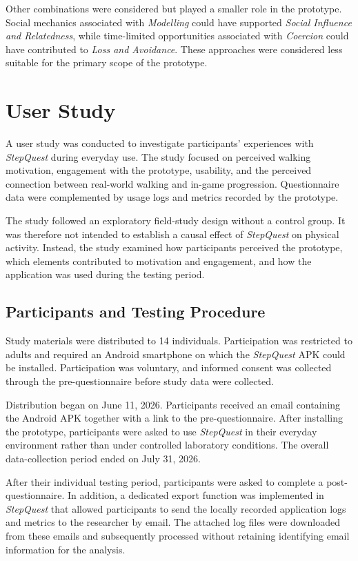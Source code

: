 Other combinations were considered but played a smaller role in the prototype. Social mechanics associated with \textit{Modelling} could have supported \textit{Social Influence and Relatedness}, while time-limited opportunities associated with \textit{Coercion} could have contributed to \textit{Loss and Avoidance}. These approaches were considered less suitable for the primary scope of the prototype.

\section{User Study}

A user study was conducted to investigate participants' experiences with \textit{StepQuest} during everyday use. The study focused on perceived walking motivation, engagement with the prototype, usability, and the perceived connection between real-world walking and in-game progression. Questionnaire data were complemented by usage logs and metrics recorded by the prototype.

The study followed an exploratory field-study design without a control group. It was therefore not intended to establish a causal effect of \textit{StepQuest} on physical activity. Instead, the study examined how participants perceived the prototype, which elements contributed to motivation and engagement, and how the application was used during the testing period.

\subsection{Participants and Testing Procedure}

Study materials were distributed to 14 individuals. Participation was restricted to adults and required an Android smartphone on which the \textit{StepQuest} APK could be installed. Participation was voluntary, and informed consent was collected through the pre-questionnaire before study data were collected.

Distribution began on June 11, 2026. Participants received an email containing the Android APK together with a link to the pre-questionnaire. After installing the prototype, participants were asked to use \textit{StepQuest} in their everyday environment rather than under controlled laboratory conditions. The overall data-collection period ended on July 31, 2026.

After their individual testing period, participants were asked to complete a post-questionnaire. In addition, a dedicated export function was implemented in \textit{StepQuest} that allowed participants to send the locally recorded application logs and metrics to the researcher by email. The attached log files were downloaded from these emails and subsequently processed without retaining identifying email information for the analysis.

